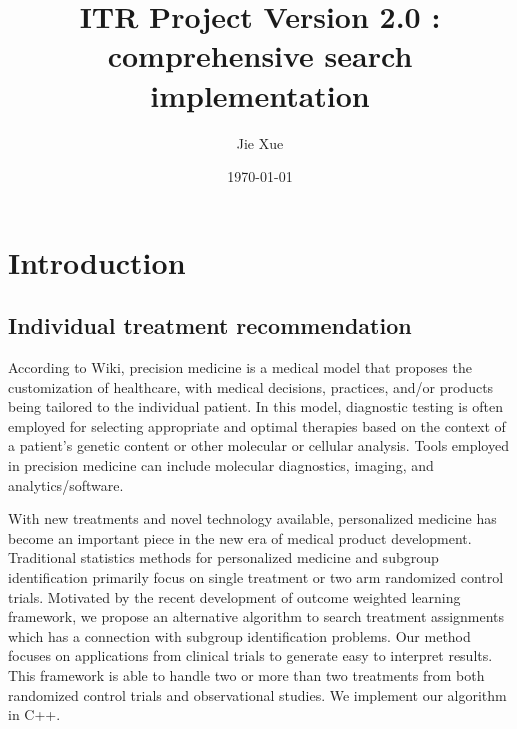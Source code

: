 \documentclass{article}
\title{ITR Project Version 2.0 : comprehensive search implementation}
\author{Jie Xue}
\date{\today}
\begin{document}
\maketitle
\tableofcontents
\pagebreak


\section{Introduction}
\subsection{Individual treatment recommendation}
According to Wiki, precision medicine is a medical model that proposes the customization of healthcare, with medical decisions, practices, and/or products being
tailored to the individual patient. In this model, diagnostic testing is often
employed for selecting appropriate and optimal therapies based on the
context of a patient's genetic content or other molecular or cellular
analysis. Tools employed in precision medicine can include molecular
diagnostics, imaging, and analytics/software.

With new treatments and novel technology available, personalized medicine has become an important piece in the
new era of medical product development. Traditional statistics methods for personalized medicine and subgroup
identification primarily focus on single treatment or two arm randomized control trials. Motivated by the recent
development of outcome weighted learning framework, we propose an alternative algorithm to search treatment
assignments which has a connection with subgroup identification problems. Our method focuses on applications
from clinical trials to generate easy to interpret results. This framework is able to handle two or more than two
treatments from both randomized control trials and observational studies. We implement our algorithm in C++. 
\end{document}

